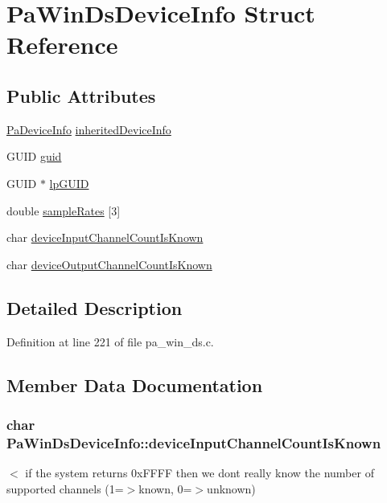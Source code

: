 \hypertarget{struct_pa_win_ds_device_info}{}\section{Pa\+Win\+Ds\+Device\+Info Struct Reference}
\label{struct_pa_win_ds_device_info}
\subsection*{Public Attributes}
\begin{DoxyCompactItemize}
\item 
\hyperlink{struct_pa_device_info}{Pa\+Device\+Info} \hyperlink{struct_pa_win_ds_device_info_a1fc878338f87a1c8042e76a057de0c7e}{inherited\+Device\+Info}
\item 
G\+U\+ID \hyperlink{struct_pa_win_ds_device_info_a0a3d0a756c34d9b1f94e72f48af7ca98}{guid}
\item 
G\+U\+ID $\ast$ \hyperlink{struct_pa_win_ds_device_info_aa3d7e46d828264cd3dc72c3e9c748178}{lp\+G\+U\+ID}
\item 
double \hyperlink{struct_pa_win_ds_device_info_a975821036d5c630b8f5f3b1a9db1c397}{sample\+Rates} \mbox{[}3\mbox{]}
\item 
char \hyperlink{struct_pa_win_ds_device_info_a394937e5eb824ac5730862c8b2989880}{device\+Input\+Channel\+Count\+Is\+Known}
\item 
char \hyperlink{struct_pa_win_ds_device_info_a4933d949b4dbb2b47137137546a47632}{device\+Output\+Channel\+Count\+Is\+Known}
\end{DoxyCompactItemize}


\subsection{Detailed Description}


Definition at line 221 of file pa\+\_\+win\+\_\+ds.\+c.



\subsection{Member Data Documentation}
\subsubsection[{\texorpdfstring{device\+Input\+Channel\+Count\+Is\+Known}{deviceInputChannelCountIsKnown}}]{\setlength{\rightskip}{0pt plus 5cm}char Pa\+Win\+Ds\+Device\+Info\+::device\+Input\+Channel\+Count\+Is\+Known}\hypertarget{struct_pa_win_ds_device_info_a394937e5eb824ac5730862c8b2989880}{}\label{struct_pa_win_ds_device_info_a394937e5eb824ac5730862c8b2989880}
$<$ if the system returns 0x\+F\+F\+FF then we don\textquotesingle{}t really know the number of supported channels (1=$>$known, 0=$>$unknown) 

